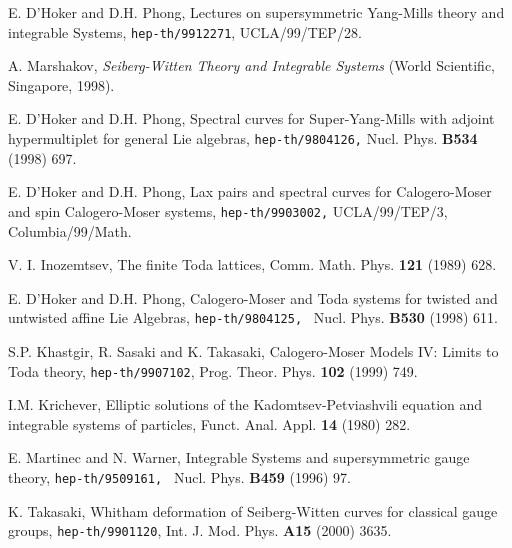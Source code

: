 \documentclass[a4paper,12pt]{article}
\begin{document}
\begin{thebibliography}{99}
  E. D'Hoker and D.H. Phong, Lectures on supersymmetric
Yang-Mills theory and integrable Systems,
\texttt{hep-th/9912271}, UCLA/99/TEP/28.

  A. Marshakov, \textit{Seiberg-Witten Theory and
Integrable Systems} (World Scientific, Singapore, 1998).

  E. D'Hoker and D.H. Phong, Spectral curves for
Super-Yang-Mills with adjoint hypermultiplet for general Lie
algebras,
\texttt{hep-th/9804126,} Nucl. Phys. \textbf{B534} (1998) 697.

  E. D'Hoker and D.H. Phong, Lax pairs and spectral curves for
Calogero-Moser and spin Calogero-Moser systems,
\texttt{hep-th/9903002,} UCLA/99/TEP/3, Columbia/99/Math.

	V. I. Inozemtsev, The finite Toda lattices, Comm. Math.
Phys. \textbf{121} (1989) 628.

  E. D'Hoker and D.H. Phong, Calogero-Moser and Toda systems
for twisted and untwisted affine Lie Algebras,
\texttt{hep-th/9804125, } Nucl. Phys. \textbf{B530 }(1998)
611.

  S.P. Khastgir, R. Sasaki and K. Takasaki, Calogero-Moser
Models IV: Limits to Toda theory, \texttt{hep-th/9907102},
Prog. Theor. Phys. \textbf{102} (1999) 749.

  I.M. Krichever, Elliptic solutions of
the Kadomtsev-Petviashvili equation and integrable systems
of particles, Funct. Anal. Appl. \textbf{14} (1980) 282.

  E. Martinec and N. Warner,
Integrable Systems and supersymmetric gauge theory,
\texttt{hep-th/9509161, } Nucl. Phys. \textbf{B459} (1996)
97.

	K. Takasaki, Whitham deformation of Seiberg-Witten curves
for classical gauge groups, \texttt{hep-th/9901120}, Int. J. Mod. Phys.
\textbf{A15} (2000) 3635.

\end{thebibliography}
\end{document}
